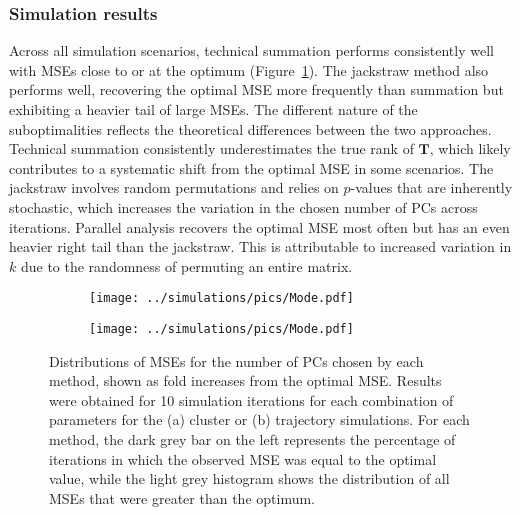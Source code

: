 \documentclass[10pt,letterpaper]{article}
\begin{document}
\subsubsection{Simulation results}
Across all simulation scenarios, technical summation performs consistently well with MSEs close to or at the optimum (Figure~\ref{fig:all}). 
The jackstraw method also performs well, recovering the optimal MSE more frequently than summation but exhibiting a heavier tail of large MSEs.
The different nature of the suboptimalities reflects the theoretical differences between the two approaches.
Technical summation consistently underestimates the true rank of $\mathbf{T}$, which likely contributes to a systematic shift from the optimal MSE in some scenarios.
The jackstraw involves random permutations and relies on $p$-values that are inherently stochastic, which increases the variation in the chosen number of PCs across iterations.
Parallel analysis recovers the optimal MSE most often but has an even heavier right tail than the jackstraw.
This is attributable to increased variation in $k$ due to the randomness of permuting an entire matrix.

\begin{figure}
\centering
\begin{subfigure}[b]{0.49\textwidth}
    \texttt{[image: ../simulations/pics/Mode.pdf]}
    \caption{}
\end{subfigure}
\begin{subfigure}[b]{0.49\textwidth}
    \texttt{[image: ../simulations/pics/Mode.pdf]}
    \caption{}
\end{subfigure}
\caption{Distributions of MSEs for the number of PCs chosen by each method, shown as fold increases from the optimal MSE.
Results were obtained for 10 simulation iterations for each combination of parameters for the (a) cluster or (b) trajectory simulations.
For each method, the dark grey bar on the left represents the percentage of iterations in which the observed MSE was equal to the optimal value,
while the light grey histogram shows the distribution of all MSEs that were greater than the optimum.}
\label{fig:all}
\end{figure}
\end{document}
